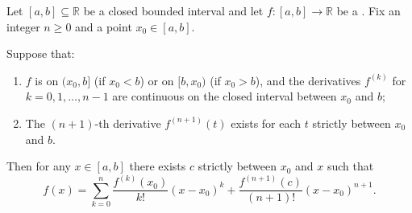 \begin{theorem} \label{theorem:taylors_theorem_with_lagrange_remainder_for_real_valued_functions}
    Let $[a, b] \subseteq \mathbb{R}$ be a closed bounded interval and let $f : [a, b] \to \mathbb{R}$ be a . Fix an integer $n \geq 0$ and a point $x_0 \in [a, b]$.

    Suppose that:
    \begin{enumerate}
        \item $f$ is  on $(x_0, b]$ (if $x_0 < b$) or on $[b, x_0)$ (if $x_0 > b$), and the derivatives $f^{(k)}$ for $k = 0, 1, \dots, n-1$ are continuous on the closed interval between $x_0$ and $b$;
        \item The $(n+1)$-th derivative $f^{(n+1)}(t)$ exists for each $t$ strictly between $x_0$ and $b$.
    \end{enumerate}
    Then for any $x \in [a, b]$ there exists $c$ strictly between $x_0$ and $x$ such that
    $$f(x) = \sum_{k=0}^{n} \frac{f^{(k)}(x_0)}{k!} (x - x_0)^k + \frac{f^{(n+1)}(c)}{(n+1)!} (x - x_0)^{n+1}.$$
\end{theorem}
